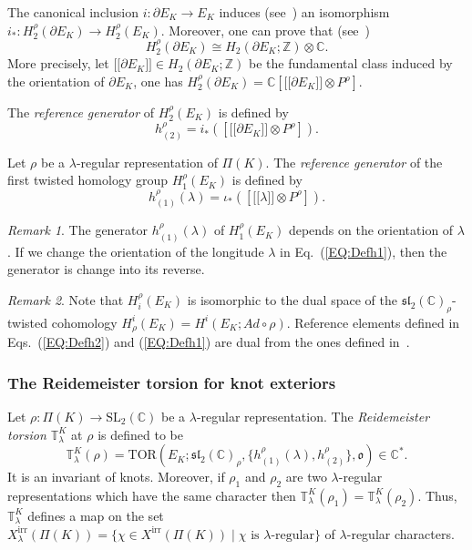 \documentclass[a4paper]{amsart}
\theoremstyle{plain}
\theoremstyle{definition}
\theoremstyle{remark}
\newtheorem{remark}{Remark}%
\newcommand{\ZZ}{{\mathbb Z}}
\newcommand{\C}{{\mathbb C}}
\newcommand{\CC}{{\mathbb C}}
\newcommand{\bord}{\partial}
\newcommand{\SL}{{\mathrm{SL}_2(\C)}}
\newcommand{\sll}{\mathfrak{sl}_2(\CC)}
\begin{document}
The canonical inclusion $i\colon \bord E_K \to E_K$ induces {(see~\cite[Corollary 3.23]{Porti:1997})} an isomorphism $i_*\colon H_2^\rho(\bord E_K) \to H_2^\rho(E_K)$. Moreover, one can prove that {(see~\cite[Proposition 3.18]{Porti:1997})}
$$H_2^\rho(\bord E_K) \cong H_2(\bord E_K; \ZZ) \otimes \CC.$$
 More precisely, let $\lbrack \! \lbrack \bord E_K \rbrack \! \rbrack \in H_2(\bord E_K; \ZZ)$ be the fundamental class induced by the orientation of $\bord E_K$, one has $H_2^\rho(\bord E_K) = \CC\left[\lbrack \! \lbrack \bord E_K \rbrack \! \rbrack \otimes P^\rho\right]$.

 The \emph{reference generator} of $H_2^\rho(E_K)$ is defined by 
\begin{equation}\label{EQ:Defh2}
h_{(2)}^\rho 
= i_*([\lbrack \! \lbrack \bord E_K \rbrack \! \rbrack \otimes P^\rho]).
\end{equation}

Let $\rho$ be a $\lambda$-regular representation of $\Pi(K)$. The \emph{reference generator} of the first twisted homology group $H_1^\rho(E_K)$ is defined by
\begin{equation}\label{EQ:Defh1}
h_{(1)}^\rho(\lambda) 
= \iota_*\left(\left[\lbrack \! \lbrack \lambda \rbrack \! \rbrack  \otimes P^\rho\right]\right).
\end{equation}

\begin{remark}
The generator $h_{(1)}^\rho(\lambda)$ of  $H_1^\rho(E_K)$ depends on the orientation of $\lambda$. If we change the orientation of  the longitude $\lambda$ in Eq.~(\ref{EQ:Defh1}),  then the generator is change into its reverse.
\end{remark}

\begin{remark}
Note that $H_i^\rho(E_K)$ is isomorphic to the dual space of the $\sll_\rho$-twisted cohomology $H^i_\rho(E_K) = H^i(E_K; Ad \circ \rho)$. Reference elements defined in Eqs.~(\ref{EQ:Defh2}) and (\ref{EQ:Defh1}) are dual from the ones defined in~\cite[Section~3.4]{JDFibre}.
\end{remark}

\subsubsection*{The Reidemeister torsion for knot exteriors}

Let $\rho \colon \Pi(K) \to \SL$ be a $\lambda$-regular representation. The \emph{Reidemeister torsion $\mathbb{T}^K_\lambda$} at $\rho$ is  
defined to be 
\begin{equation}\label{Tordef}
\mathbb{T}^K_\lambda(\rho)  = \mathrm{TOR}\left( {E_K; \sll_\rho, \{h_{(1)}^\rho(\lambda), h_{(2)}^\rho\}, \mathfrak{o}} \right) \in \CC^*.
\end{equation}
It is an invariant of knots. Moreover, if $\rho_1$ and $\rho_2$ are two $\lambda$-regular representations which have the same character then $\mathbb{T}^K_\lambda(\rho_1) = \mathbb{T}^K_\lambda(\rho_2)$. Thus, $\mathbb{T}^K_\lambda$ defines a map on the set $X^{\mathrm{irr}}_\lambda(\Pi(K)) = \{\chi \in X^{\mathrm{irr}}(\Pi(K)) \; |\; \chi \text{ is } \lambda\text{-regular}\}$ {of $\lambda$-regular characters}.
\end{document}
